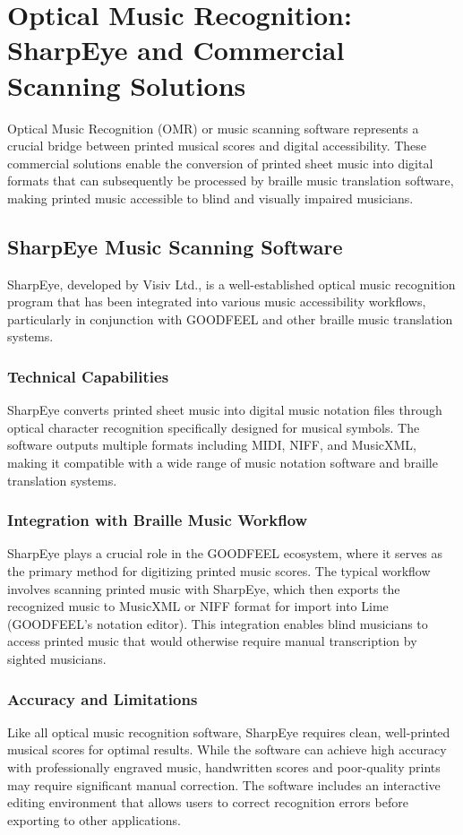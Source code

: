 \section{Optical Music Recognition: SharpEye and Commercial Scanning Solutions}

Optical Music Recognition (OMR) or music scanning software represents a crucial bridge between printed musical scores and digital accessibility. These commercial solutions enable the conversion of printed sheet music into digital formats that can subsequently be processed by braille music translation software, making printed music accessible to blind and visually impaired musicians.

\subsection{SharpEye Music Scanning Software}

SharpEye, developed by Visiv Ltd., is a well-established optical music recognition program that has been integrated into various music accessibility workflows, particularly in conjunction with GOODFEEL and other braille music translation systems.

\subsubsection{Technical Capabilities}
SharpEye converts printed sheet music into digital music notation files through optical character recognition specifically designed for musical symbols. The software outputs multiple formats including MIDI, NIFF, and MusicXML, making it compatible with a wide range of music notation software and braille translation systems.

\subsubsection{Integration with Braille Music Workflow}
SharpEye plays a crucial role in the GOODFEEL ecosystem, where it serves as the primary method for digitizing printed music scores. The typical workflow involves scanning printed music with SharpEye, which then exports the recognized music to MusicXML or NIFF format for import into Lime (GOODFEEL's notation editor). This integration enables blind musicians to access printed music that would otherwise require manual transcription by sighted musicians.

\subsubsection{Accuracy and Limitations}
Like all optical music recognition software, SharpEye requires clean, well-printed musical scores for optimal results. While the software can achieve high accuracy with professionally engraved music, handwritten scores and poor-quality prints may require significant manual correction. The software includes an interactive editing environment that allows users to correct recognition errors before exporting to other applications.

